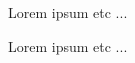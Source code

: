\newpage
{}
\begin{flushright}
\singlespacing
Lorem ipsum etc ...

Lorem ipsum etc ...
\end{flushright}
